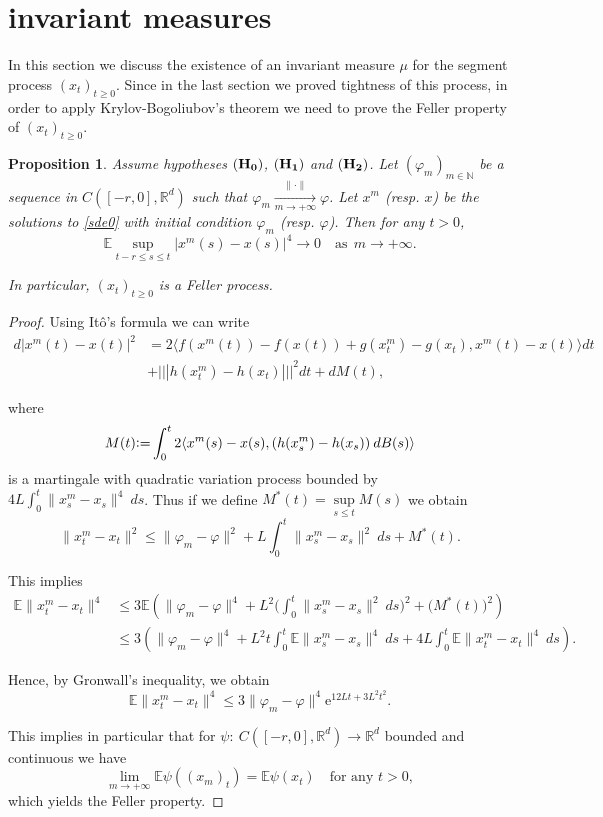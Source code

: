 \documentclass[11pt,reqno,draft]{amsart}
\newtheorem{proposition}[defi]{Proposition}
\begin{document}
\section{invariant measures}
\noindent In this section we discuss the existence of an invariant
measure $\mu$ for the segment process $(x_t)_{t\geq 0}$. Since in
the last section we proved tightness of this process, in order to
apply Krylov-Bogoliubov's theorem we need to prove the Feller
property of $(x_t)_{t\geq 0}$.
\begin{proposition}
Assume hypotheses ${\bf(H_0)}$,  ${\bf(H_1)}$ and  ${\bf(H_2)}$.
Let $(\varphi_m)_{m\in{\mathbb{N}}}$ be a sequence in $C([-r,0],{\mathbb R}^d)$ such
that $\varphi_m\xrightarrow[m\to +\infty]{\|\cdot\|} \varphi$. Let
$x^m$ (resp. $x$) be the solutions to \eqref{sde0} with initial
condition $\varphi_m$ (resp. $\varphi$). Then for any $t>0$,
\begin{equation}
{\mathbb E}\sup\limits_{t-r\leq s\leq t}|x^m(s)-x(s)|^4\rightarrow 0\quad
\mbox{as}\:\:m\to+\infty.
\end{equation}

\noindent In particular, $(x_t)_{t\geq 0}$ is a Feller process.
\end{proposition}
\begin{proof}
Using It\^{o}'s formula we can write
\begin{equation}
\begin{split}
d|x^m(t)-x(t)|^2&=2{\langle}
f(x^m(t))-f(x(t))+g(x^m_t)-g(x_t),x^m(t)-x(t){\rangle}
dt\\&+{|\!|\!|{h(x_t^m)-h(x_t)}|\!|\!|}^2dt+dM(t),
\end{split}
\end{equation}

\noindent where $$ M(t){\mathrel{\mathrm{\raise0.1ex\hbox{:}\hbox{=}\strut}}} \int_0^t 2{\langle}
x^m(s)-x(s),(h(x_s^m)-h(x_s))\:dB(s){\rangle}$$ is a martingale with
quadratic variation process bounded by
$4L\int_0^t\|x^m_s-x_s\|^4\:ds$. Thus if we define
$M^{\ast}(t)=\sup\limits_{s\leq t} M(s)$ we obtain
$$
\|x^m_t-x_t\|^2\leq
\|\varphi_m-\varphi\|^2+L\int_0^t\|x^m_s-x_s\|^2\:ds+M^{\ast}(t).
$$

\noindent This implies
\begin{equation}
\begin{split}
{\mathbb E} \|x^m_t-x_t\|^4&\leq
3{\mathbb E}\left(\|\varphi_m-\varphi\|^4+L^2\Big(\int_0^t\|x^m_s-x_s\|^2\:ds\Big)^2+\Big(M^{\ast}(t)\Big)^2\right)\\
&\leq 3
\left(\|\varphi_m-\varphi\|^4+L^2t\int_0^t{\mathbb E}\|x^m_s-x_s\|^4\:ds+4L\int_0^t{\mathbb E}\|x^m_t-x_t\|^4\:ds\right).
\end{split}
\end{equation}

\noindent Hence, by Gronwall's inequality, we obtain
$$
{\mathbb E} \|x^m_t-x_t\|^4\leq 3\|\varphi_m-\varphi\|^4{\mathrm{e}}^{12Lt+3L^2t^2}.
$$

\noindent This implies in particular that for
$\psi:\:C([-r,0],{\mathbb R}^d)\rightarrow{\mathbb R}^d$ bounded and continuous we
have
$$
\lim\limits_{m\to+\infty}{\mathbb E}\psi((x_m)_t)={\mathbb E}\psi(x_t)\quad\mbox{for
any $t>0$},
$$
which yields the Feller property.
\end{proof}
\end{document}
